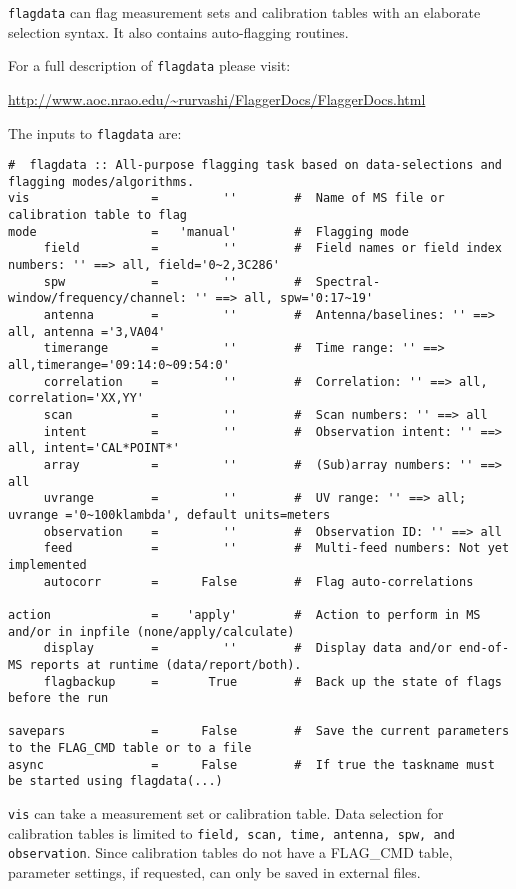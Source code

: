 {\tt flagdata} can flag measurement sets and calibration tables with
an elaborate selection syntax. It also contains auto-flagging
routines. 

For a full description of {\tt flagdata} please visit:

\url{http://www.aoc.nrao.edu/~rurvashi/FlaggerDocs/FlaggerDocs.html}

The inputs to {\tt flagdata} are:

\small
\begin{verbatim}
#  flagdata :: All-purpose flagging task based on data-selections and flagging modes/algorithms.
vis                 =         ''        #  Name of MS file or calibration table to flag
mode                =   'manual'        #  Flagging mode
     field          =         ''        #  Field names or field index numbers: '' ==> all, field='0~2,3C286'
     spw            =         ''        #  Spectral-window/frequency/channel: '' ==> all, spw='0:17~19'
     antenna        =         ''        #  Antenna/baselines: '' ==> all, antenna ='3,VA04'
     timerange      =         ''        #  Time range: '' ==> all,timerange='09:14:0~09:54:0'
     correlation    =         ''        #  Correlation: '' ==> all, correlation='XX,YY'
     scan           =         ''        #  Scan numbers: '' ==> all
     intent         =         ''        #  Observation intent: '' ==> all, intent='CAL*POINT*'
     array          =         ''        #  (Sub)array numbers: '' ==> all
     uvrange        =         ''        #  UV range: '' ==> all; uvrange ='0~100klambda', default units=meters
     observation    =         ''        #  Observation ID: '' ==> all
     feed           =         ''        #  Multi-feed numbers: Not yet implemented
     autocorr       =      False        #  Flag auto-correlations

action              =    'apply'        #  Action to perform in MS and/or in inpfile (none/apply/calculate)
     display        =         ''        #  Display data and/or end-of-MS reports at runtime (data/report/both).
     flagbackup     =       True        #  Back up the state of flags before the run

savepars            =      False        #  Save the current parameters to the FLAG_CMD table or to a file
async               =      False        #  If true the taskname must be started using flagdata(...)

\end{verbatim}
\normalsize

{\tt vis} can take a measurement set or calibration table. Data
selection for calibration tables is limited to {\tt field, scan, time,
  antenna, spw, and observation}. Since calibration tables do not have
a FLAG\_CMD table, parameter settings, if requested, can only be
saved in external files. 

